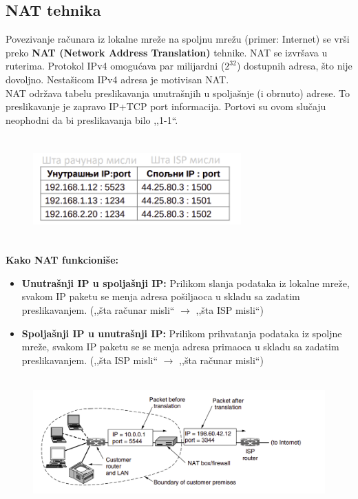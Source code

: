 \documentclass[a4paper]{article}
\begin{document}
    \subsection{NAT tehnika}
        Povezivanje računara iz lokalne mreže na spoljnu mrežu (primer: Internet) se vrši preko
        \textbf{NAT (Network Address Translation)} tehnike. NAT se izvršava u ruterima.
        Protokol IPv4 omogućava par milijardni 
        ($2^{32}$) dostupnih adresa, što nije dovoljno. Nestašicom IPv4 adresa je motivisan NAT.\\
        \indent NAT održava tabelu preslikavanja unutrašnjih u spoljašnje (i obrnuto) adrese.
        To preslikavanje je zapravo IP+TCP port informacija. Portovi su ovom slučaju neophodni
        da bi preslikavanja bilo ,,1-1``.
        \begin{figure}[H]
            \begin{center}
                \includegraphics[width=80mm,height=40mm]{Slike/nat1.png}
            \end{center}
        \end{figure}
        \noindent \textbf{Kako NAT funkcioniše:}
        \begin{itemize}
            \item \textbf{Unutrašnji IP u spoljašnji IP:} Prilikom slanja podataka iz lokalne mreže,
                  svakom IP paketu se menja adresa pošiljaoca u skladu sa zadatim preslikavanjem.
                  (,,šta računar misli`` $\rightarrow$ ,,šta ISP misli``) 
            \item \textbf{Spoljašnji IP u unutrašnji IP:} Prilikom prihvatanja podataka iz spoljne mreže,
                  svakom IP paketu se se menja adresa primaoca u skladu sa zadatim preslikavanjem.
                  (,,šta ISP misli`` $\rightarrow$ ,,šta računar misli``) 
        \end{itemize}
        \begin{figure}[H]
            \begin{center}
                \includegraphics[width=120mm,height=50mm]{Slike/nat2.png}
            \end{center}
        \end{figure}
\end{document}
